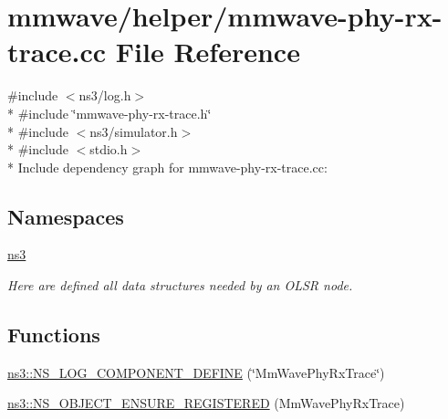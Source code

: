\hypertarget{mmwave-phy-rx-trace_8cc}{}\section{mmwave/helper/mmwave-\/phy-\/rx-\/trace.cc File Reference}
\label{mmwave-phy-rx-trace_8cc}
{\ttfamily \#include $<$ns3/log.\+h$>$}\\*
{\ttfamily \#include \char`\"{}mmwave-\/phy-\/rx-\/trace.\+h\char`\"{}}\\*
{\ttfamily \#include $<$ns3/simulator.\+h$>$}\\*
{\ttfamily \#include $<$stdio.\+h$>$}\\*
Include dependency graph for mmwave-\/phy-\/rx-\/trace.cc\+:
\subsection*{Namespaces}
\begin{DoxyCompactItemize}
\item 
 \hyperlink{namespacens3}{ns3}
\begin{DoxyCompactList}\small\item\em Here are defined all data structures needed by an O\+L\+SR node. \end{DoxyCompactList}\end{DoxyCompactItemize}
\subsection*{Functions}
\begin{DoxyCompactItemize}
\item 
\hyperlink{namespacens3_aae46bff2e1effb3360adbdb7bdb5d9dd}{ns3\+::\+N\+S\+\_\+\+L\+O\+G\+\_\+\+C\+O\+M\+P\+O\+N\+E\+N\+T\+\_\+\+D\+E\+F\+I\+NE} (\char`\"{}Mm\+Wave\+Phy\+Rx\+Trace\char`\"{})
\item 
\hyperlink{namespacens3_aabd6ef5686bf77823723b82720461c2e}{ns3\+::\+N\+S\+\_\+\+O\+B\+J\+E\+C\+T\+\_\+\+E\+N\+S\+U\+R\+E\+\_\+\+R\+E\+G\+I\+S\+T\+E\+R\+ED} (Mm\+Wave\+Phy\+Rx\+Trace)
\end{DoxyCompactItemize}

